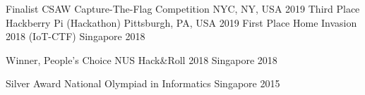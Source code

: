 


\begin{cvhonors}

  \cvhonor
    {Finalist} %
    {CSAW Capture-The-Flag Competition} %
    {NYC, NY, USA} %
    {2019} %
  \cvhonor
    {Third Place} %
    {Hackberry Pi (Hackathon)} %
    {Pittsburgh, PA, USA} %
    {2019} %
  \cvhonor
    {First Place} %
    {Home Invasion 2018 (IoT-CTF)} %
    {Singapore} %
    {2018} %


  \cvhonor
    {Winner, People's Choice} %
    {NUS Hack\&Roll 2018} %
    {Singapore} %
    {2018} %

  \cvhonor
    {Silver Award} %
    {National Olympiad in Informatics} %
    {Singapore} %
    {2015} %

\end{cvhonors}
